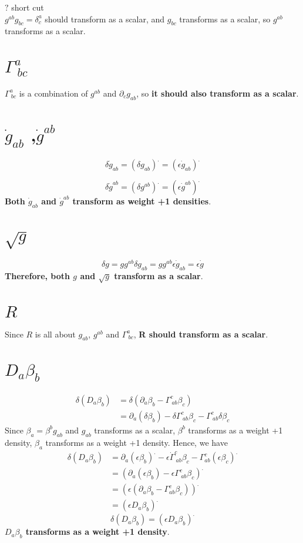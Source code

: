 \documentclass{article}
\begin{document}
$?$ short cut\\
$g^{ab}g_{bc} = \delta^{a}_{c}$ should transform as a scalar, and $g_{bc}$ transforms as a scalar, so $g^{ab}$ transforms as a scalar.  
\section{$\Gamma^{a}_{~bc}$}
$\Gamma^{a}_{~bc}$ is a combination of $g^{ab}$ and $\partial_{c}g_{ab}$, so {\bf {\color {red} it should also transform as a scalar}}.
\section{${\dot g}_{ab}$ ,${\dot g}^{ab}$}
\[
\boxed{
\delta {\dot g}_{ab} = (\delta g_{ab})^{.} = (\epsilon {\dot g_{ab}})^{.}
}
\]

\[
\boxed{
\delta {\dot g}^{ab} = (\delta g^{ab})^{.} = (\epsilon {\dot g^{ab}})^{.}
}
\]
{\bf {\color{red} Both ${\dot g}_{ab}$ and ${\dot g}^{ab}$ transform as weight +1 densities}}.
\section{$\sqrt{g}$}
\[
\boxed{
\delta g = g g^{ab}\delta g_{ab} = g g^{ab}\epsilon{\dot g}_{ab} = \epsilon {\dot g}
}
\]
{\bf{\color{red} Therefore, both $g$ and $\sqrt{g}$ transform as a scalar}}.
\section{$R$}
Since $R$ is all about $g_{ab}$, $g^{ab}$ and $\Gamma^{a}_{~bc}$, {\bf {\color{red}R should transform as a scalar}}. 
\section{$D_{a}\beta_{b}$}
\begin{align*}
\delta (D_{a}\beta_{b}) & = \delta (\partial_{a} \beta_{b} - \Gamma^{c}_{~ab}\beta_{c})\\
& = \partial_{a} (\delta \beta_{b}) - \delta \Gamma^{c}_{~ab} \beta_{c} - \Gamma^{c}_{~ab} \delta \beta_{c}
\end{align*}
Since $\beta_{a} = \beta^{b}g_{ab}$ and $g_{ab}$ transforms as a scalar, $\beta^{b}$ transforms as a weight +1 density, $\beta_{a}$ transforms as a weight +1 density. Hence, we have
\begin{align*}
\delta (D_{a}\beta_{b}) & = \partial_{a} (\epsilon \beta_{b})^{.} - \epsilon {\dot \Gamma}^{c}_{~ab} \beta_{c} - \Gamma^{c}_{ab}(\epsilon \beta_{c})^{.}\\
& = (\partial_{a} (\epsilon \beta_{b}) - \epsilon \Gamma^{c}_{~ab}\beta_{c})^{.}\\
& = (\epsilon (\partial_{a} \beta_{b} - \Gamma^{c}_{ab}\beta_{c}))^{.}\\
& = (\epsilon D_{a}\beta_{b})^{.}
\end{align*}
\[
\boxed{
\delta (D_{a}\beta_{b}) = (\epsilon D_{a}\beta_{b})^{.}
}
\]
{\bf {\color{red} $D_{a}\beta_{b}$ transforms as a weight +1 density}}.
\end{document}
